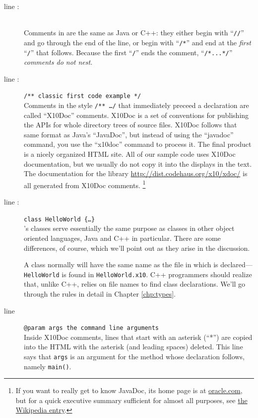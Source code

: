 \begin{description}
\item [line :] 
\\
Comments in \Xten{} are the same as Java or C++: they either begin
with ``{\tt //}'' and go through the end of the line, or begin with ``{\tt /*}''
and end at the \emph{first} ``{\tt */}'' that follows.  Because the first ``{\tt */}'' 
ends the comment, ``{\tt /*...*/}'' {\em comments do not nest}. 

\item[line :] {\tt /** classic first code example
*/\\}
Comments in the style {\tt /** \ldots */} that immediately preceed a
declaration are called ``X10Doc'' comments. X10Doc is a set of conventions for
publishing the APIs for whole directory trees of \Xten{} source files.  X10Doc
follows that same format as Java's ``JavaDoc'', but instead of using the
``javadoc'' command, you use the ``x10doc'' command to process it.  The final
product is a nicely organized HTML site. 
All of our sample code uses X10Doc documentation, but we usually
do not copy it into the displays in the text.
The documentation for the \Xten{} library 
\href{http://dist.codehaus.org/x10/xdoc/}{http://dist.codehaus.org/x10/xdoc/}
is all generated from X10Doc comments.
\footnote{If you want
  to really get to know JavaDoc, its home page is at  
  \href{http://www.oracle.com/technetwork/java/javase/documentation/index-jsp-135444.html}{oracle.com},
  but for a quick executive summary sufficient for almost all purposes, see
  \href{http://en.wikipedia.org/wiki/Javadoc} {the Wikipedia entry}.
}

\item [line :] {\tt class HelloWorld \{\ldots \}}\\
\Xten's classes serve essentially the same purpose as classes in other object
oriented languages, Java and C++ in particular.  There are some differences, of
course, which we'll point out as they arise in the discussion.

A class normally will have the same name as the file in which is
declared---\eg{} {\tt HelloWorld} is found in {\tt HelloWorld.x10}.  C++
programmers should realize that, unlike C++, \Xten{} relies on file names to
find class declarations.  We'll go through the rules in detail in Chapter
\ref{chp:types}.

\item [line ]{\tt * @param args the command line
arguments}\\
Inside X10Doc comments, lines that start with an asterisk (``*'') are 
copied into the HTML with the asterisk (and leading spaces) deleted. 
This line says that {\tt args} is an argument for the method whose
declaration follows, namely {\tt main()}.


\end{description}
